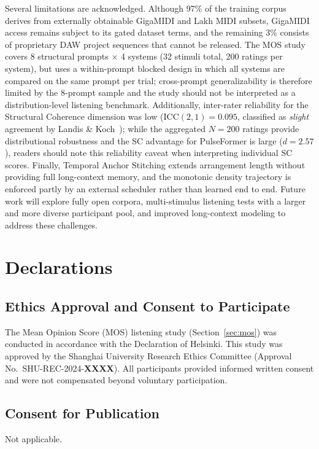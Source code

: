 \documentclass[pdflatex,sn-mathphys-num,twocolumn]{sn-jnl}
\theoremstyle{thmstyleone}
\theoremstyle{thmstyletwo}
\begin{document}
Several limitations are acknowledged. Although 97\% of the training corpus derives from externally obtainable GigaMIDI and Lakh MIDI subsets, GigaMIDI access remains subject to its gated dataset terms, and the remaining 3\% consists of proprietary DAW project sequences that cannot be released. The MOS study covers 8 structural prompts $\times$ 4 systems (32 stimuli total, 200 ratings per system), but uses a within-prompt blocked design in which all systems are compared on the same prompt per trial; cross-prompt generalizability is therefore limited by the 8-prompt sample and the study should not be interpreted as a distribution-level listening benchmark. Additionally, inter-rater reliability for the Structural Coherence dimension was low ($\mathrm{ICC}(2,1)=0.095$, classified as \emph{slight} agreement by Landis \& Koch~\cite{koo2016guideline}); while the aggregated $N\!=\!200$ ratings provide distributional robustness and the SC advantage for PulseFormer is large ($d=2.57$), readers should note this reliability caveat when interpreting individual SC scores. Finally, Temporal Anchor Stitching extends arrangement length without providing full long-context memory, and the monotonic density trajectory is enforced partly by an external scheduler rather than learned end to end. Future work will explore fully open corpora, multi-stimulus listening tests with a larger and more diverse participant pool, and improved long-context modeling to address these challenges.


\section*{Declarations}

\subsection*{Ethics Approval and Consent to Participate}
The Mean Opinion Score (MOS) listening study (Section~\ref{sec:mos}) was conducted in accordance with the Declaration of Helsinki.
This study was approved by the Shanghai University Research Ethics Committee (Approval No.~SHU-REC-2024-\textbf{XXXX}).
All participants provided informed written consent and were not compensated beyond voluntary participation.

\subsection*{Consent for Publication}
Not applicable.
\end{document}
